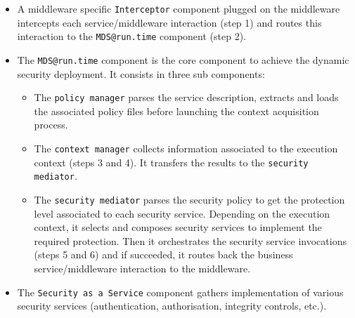 \documentclass[runningheads,a4paper]{llncs}
\begin{document}
\begin{itemize}
\settowidth{\leftmargin}{{\Large$\square$}}\advance\leftmargin{}
\itemsep5pt\relax
\renewcommand\labelitemi{{\lower1.5pt\hbox{\Large$\square$}}}
\item A middleware specific \texttt{Interceptor} component plugged on the middleware intercepts each service/middleware interaction (step 1) and routes this interaction to the \texttt{MDS@run.time} component (step 2).
\item	The \texttt{MDS@run.time} component is the core component to achieve the dynamic security deployment. It consists in three sub components:
\begin{itemize}
\item	The \texttt{policy manager} parses the service description, extracts and loads the associated policy files before launching the context acquisition process.
\item The \texttt{context manager} collects information associated to the execution context (steps 3 and 4). It transfers the results to the \texttt{security mediator}.
\item	The \texttt{security mediator} parses the security policy to get the protection level associated to each security service. Depending on the execution context, it selects and composes security services to implement the required protection. Then it orchestrates the security service invocations (steps 5 and 6) and if succeeded, it routes back the business service/middleware interaction to the middleware.
\end{itemize}
\item The \texttt{Security as a Service} component gathers implementation of various security services (authentication, authorisation, integrity controls, etc.).
\end{itemize}
\end{document}
